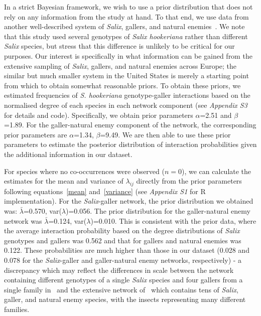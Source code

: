 \documentclass[12pt]{article}
\begin{document}
      In a strict Bayesian framework, we wish to use a prior distribution that does not rely on any information from the study at hand. To that end, we use data from another well-described system of \emph{Salix}, gallers, and natural enemies~\citep{Barbour2016,Barbour2016Dryad}. We note that this study used several genotypes of \emph{Salix hookeriana} rather than different \emph{Salix} species, but stress that this difference is unlikely to be critical for our purposes. Our interest is specifically in what information can be gained from the extensive sampling of \emph{Salix}, gallers, and natural enemies across Europe; the similar but much smaller system in the United States is merely a starting point from which to obtain somewhat reasonable priors. To obtain these priors, we estimated frequencies of  \emph{S. hookeriana} genotype-galler interactions based on the normalised degree of each species in each network component (see \emph{Appendix S3} for details and code). Specifically, we obtain prior parameters $\alpha$=2.51 and $\beta$=1.89. For the galler-natural enemy component of the network, the corresponding prior parameters are $\alpha$=1.34, $\beta$=9.49. We are then able to use these prior parameters to estimate the posterior distribution of interaction probabilities given the additional information in our dataset.
  

      For species where no co-occurrences were observed ($n=0$), we can calculate the estimates for the mean and variance of $\lambda_{ij}$ directly from the prior parameters following equations~\ref{mean} and~\ref{variance} (see \emph{Appendix S1} for R implementation). For the \emph{Salix}-galler network, the prior distribution we obtained was: $\bar\lambda$=0.570, var($\lambda$)=0.056. The prior distribution for the galler-natural enemy network was $\bar\lambda$=0.124, var($\lambda$)=0.010. This is consistent with the prior data, where the average interaction probability based on the degree distributions of \emph{Salix} genotypes and gallers was 0.562 and that for gallers and natural enemies was 0.122. These probabilities are much higher than those in our dataset (0.028 and 0.078 for the \emph{Salix}-galler and galler-natural enemy networks, respectively) - a discrepancy which may reflect the differences in scale between the network containing different genotypes of a single \emph{Salix} species and four gallers from a single family in~\citet{Barbour2016} and the extensive network of~\citet{Kopelke2017} which contains tens of \emph{Salix}, galler, and natural enemy species, with the insects representing many different families.
\end{document}
